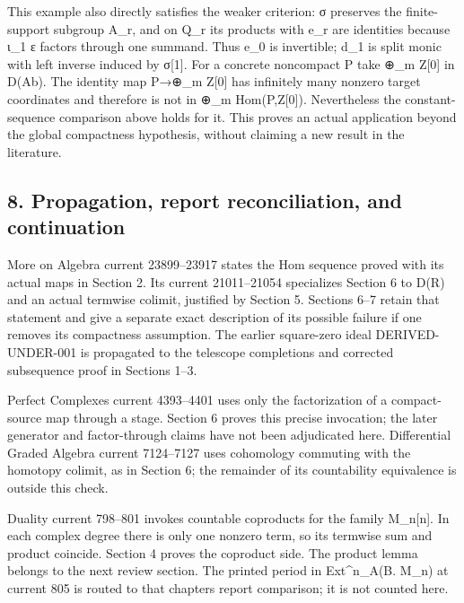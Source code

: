 \documentclass[11pt]{article}
\begin{document}
This example also directly satisfies the weaker criterion:\allowbreak{} σ preserves the finite-support subgroup A\_\allowbreak{}r,\allowbreak{} and on Q\_\allowbreak{}r its products with e\_\allowbreak{}r are identities because ι\_\allowbreak{}1 ε factors through one summand. Thus e\_\allowbreak{}0 is invertible; d\_\allowbreak{}1 is split monic with left inverse induced by σ[1]\allowbreak{}. For a concrete noncompact P take \allowbreak{}⊕\_\allowbreak{}m Z[0]\allowbreak{} in D(Ab)\allowbreak{}. The identity map P\allowbreak{}→\allowbreak{}⊕\_\allowbreak{}m Z[0]\allowbreak{} has infinitely many nonzero target coordinates and therefore is not in \allowbreak{}⊕\_\allowbreak{}m Hom(P,\allowbreak{}Z[0]\allowbreak{})\allowbreak{}. Nevertheless the constant-sequence comparison above holds for it. This proves an actual application beyond the global compactness hypothesis,\allowbreak{} without claiming a new result in the literature.

\subsection{\texorpdfstring{8. Propagation,\allowbreak{} report reconciliation,\allowbreak{} and continuation}{8.  report  and continuation}}\label{proofs-10139-10427-propagation-report-reconciliation-and-continuation}

More on Algebra current 23899–\allowbreak{}23917 states the Hom sequence proved with its actual maps in Section 2. Its current 21011–\allowbreak{}21054 specializes Section 6 to D(R)\allowbreak{} and an actual termwise colimit,\allowbreak{} justified by Section 5. Sections 6–\allowbreak{}7 retain that statement and give a separate exact description of its possible failure if one removes its compactness assumption. The earlier square-zero ideal DERIVED-UNDER-001 is propagated to the telescope completions and corrected subsequence proof in Sections 1–\allowbreak{}3.

Perfect Complexes current 4393–\allowbreak{}4401 uses only the factorization of a compact-source map through a stage. Section 6 proves this precise invocation; the later generator and factor-through claims have not been adjudicated here. Differential Graded Algebra current 7124–\allowbreak{}7127 uses cohomology commuting with the homotopy colimit,\allowbreak{} as in Section 6; the remainder of its countability equivalence is outside this check.

Duality current 798–\allowbreak{}801 invokes countable coproducts for the family M\_\allowbreak{}n[n]\allowbreak{}. In each complex degree there is only one nonzero term,\allowbreak{} so its termwise sum and product coincide. Section 4 proves the coproduct side. The product lemma belongs to the next review section. The printed period in Ext\textasciicircum{}n\_\allowbreak{}A(B. M\_\allowbreak{}n)\allowbreak{} at current 805 is routed to that chapter\textquotesingle s report comparison; it is not counted here.
\end{document}
